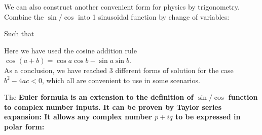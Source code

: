 \documentclass[class=article, crop=false, 12pt]{standalone}
\begin{document}
We can also construct another convenient form for physics by trigonometry. 
Combine the $\sin/\cos$ into 1 sinusoidal function by change of variables:

Such that 

Here we have used the cosine addition rule $\cos{(a+b)} = \cos{a}\cos{b}-\sin{a}\sin{b}$.  \\

As a conclusion, we have reached 3 different forms of solution for the case $b^2-4ac<0$, 
which all are convenient to use in some scenarios.




\begin{notation}
    The \bf{Euler formula} is an extension to the definition of $\sin/\cos$ function to complex number inputs.
    It can be proven by Taylor series expansion:
    It allows any complex number $p+iq$ to be expressed in polar form:


\end{notation}
\end{document}

